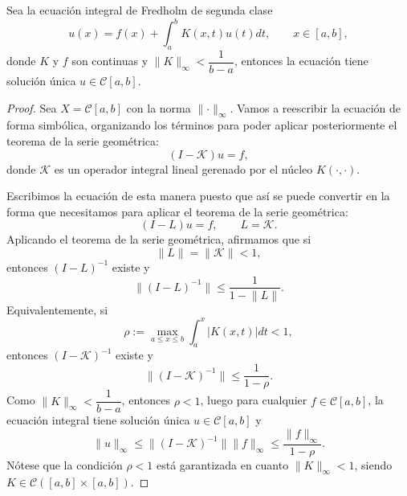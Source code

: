 \begin{corolario}\label{ej:1}
	Sea la ecuación integral de Fredholm de segunda clase
	\begin{equation}
	u(x) = f(x)+ \int_{a}^{b}K(x,t)u(t)dt, \qquad x \in [a,b],
	\end{equation}
	donde $K$ y $f$ son continuas y $\lVert K \rVert_{\infty} < \dfrac{1}{b-a}$, entonces la ecuación tiene solución única $u \in \mathcal{C}[a,b]$.
	\begin{proof}
		Sea $X = \mathcal{C}[a,b]$ con la norma $\lVert \cdot \rVert_\infty$. Vamos a reescribir la ecuación de forma simbólica, organizando los términos para poder aplicar posteriormente el teorema de la serie geométrica:
		\begin{equation}
			(I-\mathcal{K})u = f,
		\end{equation}
		donde $\mathcal{K}$ es un operador integral lineal gerenado por el núcleo $K (\cdot , \cdot )$.
		
		Escribimos la ecuación de esta manera puesto que así se puede convertir en la forma que necesitamos para aplicar el teorema de la serie geométrica:
		\begin{equation}
			(I-L)u = f, \qquad L = \mathcal{K}.
		\end{equation}
		Aplicando el teorema de la serie geométrica, afirmamos que si
		\begin{equation}
			\lVert L \rVert = \lVert \mathcal{K} \rVert < 1,
		\end{equation}
		entonces $(I-L)^{-1}$ existe y
		\begin{equation}
			\lVert(I-L)^{-1}\rVert \leqslant \dfrac{1}{1 - \lVert L \rVert}.
		\end{equation}
		Equivalentemente, si
		\begin{equation}
			\rho := \max_{a \leqslant x \leqslant b} \int_{a}^{x}|K(x,t)|dt < 1,
		\end{equation}
		entonces $(I - \mathcal{K})^{-1}$ existe y 
		\begin{equation}
			\lVert (I - \mathcal{K})^{-1}\rVert \leqslant \dfrac{1}{1 - \rho }.
		\end{equation}
		Como $\lVert K \rVert_{\infty} < \dfrac{1}{b-a}$, entonces $\rho < 1$, luego para cualquier $f \in \mathcal{C}[a,b]$, la ecuación integral tiene solución única $u \in \mathcal{C}[a,b]$ y 
		\begin{equation}
			\lVert u \rVert_\infty \leqslant \lVert (I - \mathcal{K})^{-1} \rVert \lVert f \rVert_\infty \leqslant \dfrac{\lVert f \rVert_\infty}{1 - \rho }.
		\end{equation}
		Nótese que la condición $\rho < 1$ está garantizada en cuanto $\lVert K \rVert_\infty < 1$, siendo $K \in \mathcal{C}([a,b]\times [a,b])$.
	\end{proof}
\end{corolario}
